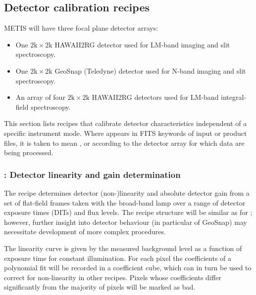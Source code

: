 \subsection{Detector calibration recipes}
\label{Sec:detector_calibration}

METIS will have three focal plane detector arrays:
\begin{itemize}
\item One $2\mathrm{k}\times 2\mathrm{k}$ HAWAII2RG detector used for
  LM-band imaging and slit spectroscopy.
\item One $2\mathrm{k}\times 2\mathrm{k}$ GeoSnap (Teledyne) detector
  used for N-band imaging and slit spectroscopy.
\item An array of four $2\mathrm{k}\times 2\mathrm{k}$ HAWAII2RG
  detectors used for LM-band integral-field spectroscopy.
\end{itemize}
This section lists recipes that calibrate detector characteristics
independent of a specific instrument mode. Where  appears
in FITS keywords of input or product files, it is taken to mean
,  or  according to the detector
array for which data are being processed.
\subsubsection{: Detector linearity and gain determination} \label{rec:metis_det_lingain}

The recipe \hyperref[rec:metis_det_lingain]{} determines detector (non-)linearity and absolute detector
gain from a set of flat-field frames taken with the broad-band lamp
over a range of detector exposure times (DITs) and flux levels. The
recipe structure will be similar as for  %
\cite{detmon-manual}; however, further insight into detector behaviour
(in particular of GeoSnap) may necessitate development of more complex
procedures.

The linearity curve is given by the measured background level as a
function of exposure time for constant illumination. For each pixel
the coefficients of a polynomial fit will be recorded in a
coefficient cube, which can in turn be used to correct for
non-linearity in other recipes. Pixels whose coefficients differ
significantly from the majority of pixels will be marked as bad.

